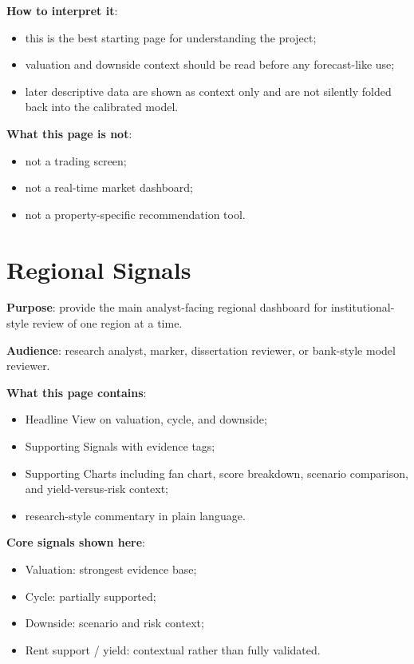 \documentclass[11pt,a4paper]{article}
\begin{document}
\textbf{How to interpret it}:
\begin{itemize}[leftmargin=1.5em]
  \item this is the best starting page for understanding the project;
  \item valuation and downside context should be read before any forecast-like use;
  \item later descriptive data are shown as context only and are not silently folded back into the calibrated model.
\end{itemize}

\textbf{What this page is not}:
\begin{itemize}[leftmargin=1.5em]
  \item not a trading screen;
  \item not a real-time market dashboard;
  \item not a property-specific recommendation tool.
\end{itemize}

\section{Regional Signals}

\textbf{Purpose}: provide the main analyst-facing regional dashboard for
institutional-style review of one region at a time.

\textbf{Audience}: research analyst, marker, dissertation reviewer, or
bank-style model reviewer.

\textbf{What this page contains}:
\begin{itemize}[leftmargin=1.5em]
  \item Headline View on valuation, cycle, and downside;
  \item Supporting Signals with evidence tags;
  \item Supporting Charts including fan chart, score breakdown, scenario comparison, and yield-versus-risk context;
  \item research-style commentary in plain language.
\end{itemize}

\textbf{Core signals shown here}:
\begin{itemize}[leftmargin=1.5em]
  \item Valuation: strongest evidence base;
  \item Cycle: partially supported;
  \item Downside: scenario and risk context;
  \item Rent support / yield: contextual rather than fully validated.
\end{itemize}
\end{document}

